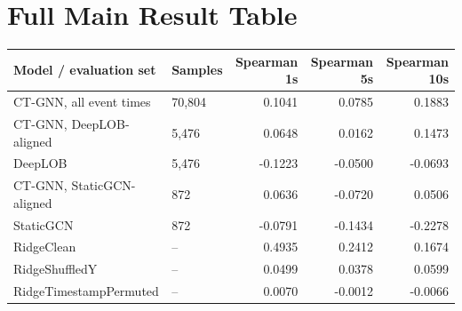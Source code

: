 \documentclass[11pt]{article}
\begin{document}
\section{Full Main Result Table}

\begin{center}
\begin{tabular}{llrrr}
\toprule
Model / evaluation set & Samples & Spearman 1s & Spearman 5s & Spearman 10s \\
\midrule
CT-GNN, all event times & 70,804 & 0.1041 & 0.0785 & 0.1883 \\
CT-GNN, DeepLOB-aligned & 5,476 & 0.0648 & 0.0162 & 0.1473 \\
DeepLOB & 5,476 & -0.1223 & -0.0500 & -0.0693 \\
CT-GNN, StaticGCN-aligned & 872 & 0.0636 & -0.0720 & 0.0506 \\
StaticGCN & 872 & -0.0791 & -0.1434 & -0.2278 \\
RidgeClean & -- & 0.4935 & 0.2412 & 0.1674 \\
RidgeShuffledY & -- & 0.0499 & 0.0378 & 0.0599 \\
RidgeTimestampPermuted & -- & 0.0070 & -0.0012 & -0.0066 \\
\bottomrule
\end{tabular}
\end{center}
\newpage
\end{document}
